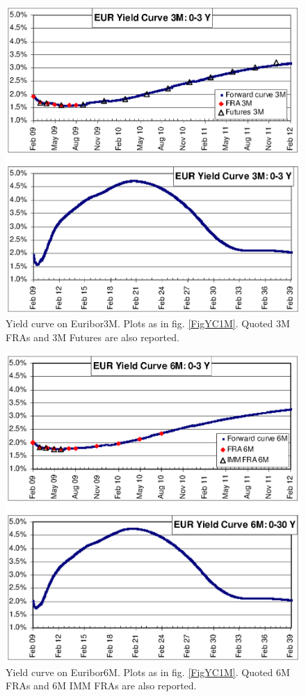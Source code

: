 \documentclass[11pt,reqno]{amsart}
\begin{document}
\begin{figure}[p]
\centering
\includegraphics[scale=1.0]{../figures/FigYC3M}
\caption{Yield curve on Euribor3M. Plots as in fig. \protect\ref{FigYC1M}. Quoted 3M FRAs and 3M Futures are also reported.}
\label{FigYC3M}
\end{figure}
\newpage

\begin{figure}[p]
\centering
\includegraphics[scale=1.0]{../figures/FigYC6M}
\caption{Yield curve on Euribor6M. Plots as in fig. \protect\ref{FigYC1M}. Quoted 6M FRAs and 6M IMM FRAs are also reported.}
\label{FigYC6M}
\end{figure}
\newpage
\end{document}
